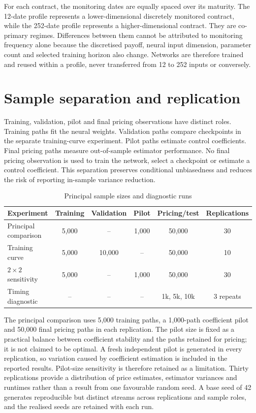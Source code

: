 For each contract, the monitoring dates are equally spaced over its maturity. The 12-date profile represents a lower-dimensional discretely monitored contract, while the 252-date profile represents a higher-dimensional contract. They are co-primary regimes. Differences between them cannot be attributed to monitoring frequency alone because the discretised payoff, neural input dimension, parameter count and selected training horizon also change. Networks are therefore trained and reused within a profile, never transferred from 12 to 252 inputs or conversely.

\section{Sample separation and replication}

Training, validation, pilot and final pricing observations have distinct roles. Training paths fit the neural weights. Validation paths compare checkpoints in the separate training-curve experiment. Pilot paths estimate control coefficients. Final pricing paths measure out-of-sample estimator performance. No final pricing observation is used to train the network, select a checkpoint or estimate a control coefficient. This separation preserves conditional unbiasedness and reduces the risk of reporting in-sample variance reduction.

\begin{table}[htbp]
    \centering
    \caption{Principal sample sizes and diagnostic runs}
    \label{tab:sample_sizes}
    \begin{tabular}{lccccc}
        \hline
        Experiment & Training & Validation & Pilot & Pricing/test & Replications \\
        \hline
        Principal comparison & 5{,}000 & -- & 1{,}000 & 50{,}000 & 30 \\
        Training curve & 5{,}000 & 10{,}000 & -- & 50{,}000 & 10 \\
        $2 \times 2$ sensitivity & 5{,}000 & -- & 1{,}000 & 50{,}000 & 30 \\
        Timing diagnostic & -- & -- & -- & 1k, 5k, 10k & 3 repeats \\
        \hline
    \end{tabular}
\end{table}

The principal comparison uses 5{,}000 training paths, a 1{,}000-path coefficient pilot and 50{,}000 final pricing paths in each replication. The pilot size is fixed as a practical balance between coefficient stability and the paths retained for pricing; it is not claimed to be optimal. A fresh independent pilot is generated in every replication, so variation caused by coefficient estimation is included in the reported results. Pilot-size sensitivity is therefore retained as a limitation. Thirty replications provide a distribution of price estimates, estimator variances and runtimes rather than a result from one favourable random seed. A base seed of 42 generates reproducible but distinct streams across replications and sample roles, and the realised seeds are retained with each run.

